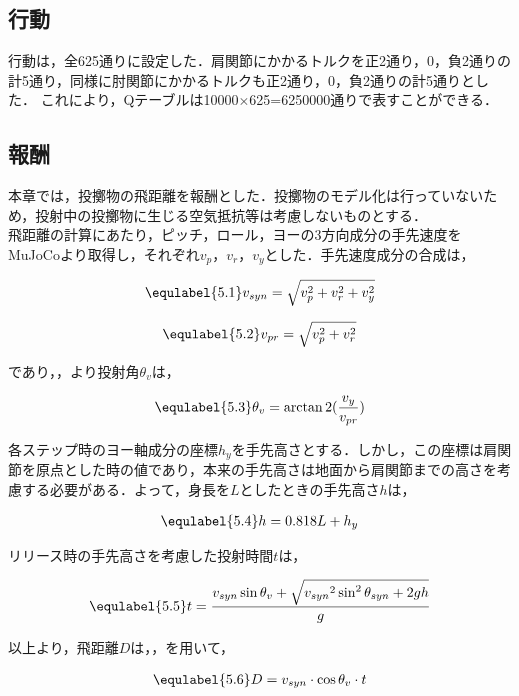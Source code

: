 \subsection{行動}
行動は，全625通りに設定した．肩関節にかかるトルクを正2通り，0，負2通りの計5通り，同様に肘関節にかかるトルクも正2通り，0，負2通りの計5通りとした．
これにより，Qテーブルは10000$\times$625=6250000通りで表すことができる．
\subsection{報酬}
本章では，投擲物の飛距離を報酬とした．投擲物のモデル化は行っていないため，投射中の投擲物に生じる空気抵抗等は考慮しないものとする．\\
飛距離の計算にあたり，ピッチ，ロール，ヨーの3方向成分の手先速度をMuJoCoより取得し，それぞれ$v_{p}$，$v_{r}$，$v_{y}$とした．手先速度成分の合成は，

\begin{eqnarray}
  \equlabel{5.1}
  v_{syn} = \sqrt{v_{p}^{2} + v_{r}^{2} + v_{y}^{2}}
\end{eqnarray}

\begin{eqnarray}
  \equlabel{5.2}
  v_{pr} = \sqrt{v_{p}^{2} + v_{r}^{2}}
\end{eqnarray}

であり，，より投射角$\theta_{v}$は，

\begin{eqnarray}
  \equlabel{5.3}
  \theta_{v} = \arctan2(\frac{v_{y}}{v_{pr}})
\end{eqnarray}

各ステップ時のヨー軸成分の座標$h_{y}$を手先高さとする．しかし，この座標は肩関節を原点とした時の値であり，本来の手先高さは地面から肩関節までの高さを考慮する必要がある．よって，身長を$L$としたときの手先高さ$h$は，

\begin{eqnarray}
  \equlabel{5.4}
  h = 0.818L + h_{y}
\end{eqnarray}

リリース時の手先高さを考慮した投射時間$t$は，

\begin{eqnarray}
  \equlabel{5.5}
  t = \frac{v_{syn}\sin\theta_{v} + \sqrt{{v_{syn}}^2\sin^2\theta_{syn} + 2gh}}{g}
\end{eqnarray}


以上より，飛距離$D$は，，を用いて，

\begin{eqnarray}
  \equlabel{5.6}
  D = v_{syn} \cdot \cos\theta_{v} \cdot t
\end{eqnarray}

